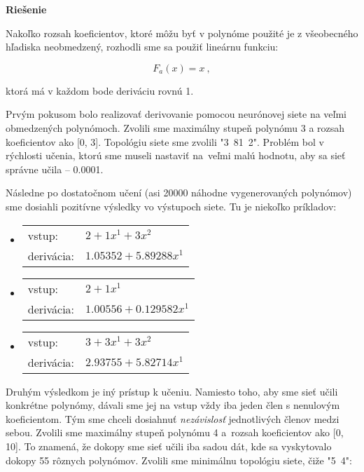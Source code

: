 \documentclass[12pt]{article}
\newcommand{\mysmallsection}[1]{\vspace{0.5cm}{\centering\large\textbf{#1}\\}\normalsize\vspace{0.5cm}}
\begin{document}
{\vspace*{0.5cm}\centering\textbf{Riešenie}\\}

Nakoľko rozsah koeficientov, ktoré môžu byť v polynóme použité je z všeobecného hľadiska neobmedzený, rozhodli sme sa použiť lineárnu funkciu: 

\begin{equation}
F_a(x)=x~,
\end{equation}

\noindent ktorá má v každom bode deriváciu rovnú 1.  

\mysmallsection{Výsledky}

Prvým pokusom bolo realizovať derivovanie pomocou neurónovej siete na veľmi obmedzených polynómoch. Zvolili sme maximálny stupeň polynómu 3 a rozsah koeficientov ako [0, 3]. Topológiu siete sme zvolili "3~81~2". Problém bol v rýchlosti učenia, ktorú sme museli nastaviť na~veľmi malú hodnotu, aby sa sieť správne učila -- 0.0001.

Následne po dostatočnom učení (asi 20000 náhodne vygenerovaných polynómov) sme dosiahli pozitívne výsledky vo výstupoch siete. Tu je niekoľko príkladov:

\begin{itemize}
\item \begin{tabular}{ l l }
		vstup: & $2 + 1x^1 + 3x^2$\\
		derivácia: & $1.05352 + 5.89288x^1 $
	  \end{tabular}
\item \begin{tabular}{ l l }
		vstup: & $2 + 1x^1$\\
		derivácia: & $1.00556 + 0.129582x^1$
	  \end{tabular}
\item \begin{tabular}{ l l }
		vstup: & $3 + 3x^1 + 3x^2$\\
		derivácia: & $2.93755 + 5.82714x^1$
	  \end{tabular}
\end{itemize}

Druhým výsledkom je iný prístup k učeniu. Namiesto toho, aby sme sieť učili konkrétne polynómy, dávali sme jej na vstup vždy iba jeden člen s nenulovým koeficientom. Tým sme chceli dosiahnuť \textit{nezávislosť} jednotlivých členov medzi sebou. Zvolili sme maximálny stupeň polynómu 4 a~rozsah koeficientov ako [0, 10]. To znamená, že dokopy sme sieť učili iba sadou dát, kde sa vyskytovalo dokopy 55 rôznych polynómov. Zvolili sme minimálnu topológiu siete, čiže "5~4":
\end{document}
